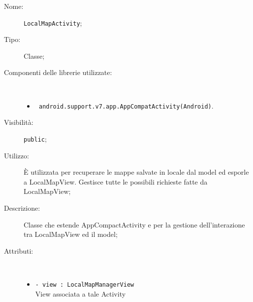 \documentclass[../DefinizioneDiProdotto.tex]{subfiles}
\begin{document}
    \begin{description}
\item[Nome:] \texttt{LocalMapActivity};
\item[Tipo:] Classe;
\item[Componenti delle librerie utilizzate:] \
\begin{itemize}
\item \texttt{ android.support.v7.app.AppCompatActivity(Android)}.

\end{itemize}
\item[Visibilità:] \texttt{public};
\item[Utilizzo:] È utilizzata per recuperare le mappe salvate in locale dal model ed esporle a LocalMapView. Gestisce tutte le possibili richieste fatte da LocalMapView;
\item[Descrizione:] Classe che estende AppCompactActivity e per la gestione dell'interazione tra LocalMapView ed il model;
\item[Attributi:] \
\begin{itemize}
\item \texttt{- view : LocalMapManagerView}\\
View associata a tale Activity


\end{itemize}
\end{description}
\end{document}
